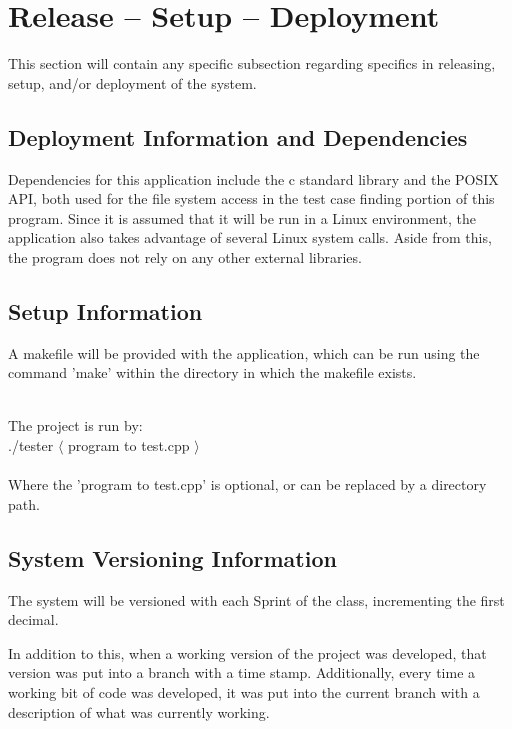 
\chapter{Release -- Setup -- Deployment}
This section will contain any specific subsection regarding specifics in releasing, 
setup, and/or deployment of the system. 


\section{Deployment Information and Dependencies}
Dependencies for this application include the c standard library and the POSIX API, both used for the
file system access in the test case finding portion of this program. Since it is assumed that it will be run
in a Linux environment, the application also takes advantage of several Linux system calls. Aside from this,
the program does not rely on any other external libraries.



\section{Setup Information}
A makefile will be provided with the application, which can be run using the command 'make' within the 
directory in which the makefile exists.

\\
The project is run by: \\
./tester $\langle$ program to test.cpp $\rangle$
\\
\\
Where the 'program to test.cpp' is optional, or can be replaced by a directory path.



\section{System  Versioning Information}
The system will be versioned with each Sprint of the class, incrementing the first decimal.

In addition to this, when a working version of the project was developed, that version was put into a branch with a time stamp. 
Additionally, every time a working bit of code was developed, it was put into the current branch with 
a description of what was currently working.
